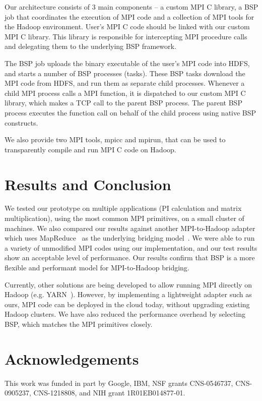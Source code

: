 \documentclass[10pt,twocolumn,letterpaper]{article}
\begin{document}
Our architecture consists of 3 main components -- a custom MPI C library, a BSP job that coordinates the execution of MPI code and a collection of MPI tools for the Hadoop environment. User's MPI C code should be linked with our custom MPI C library. This library is responsible for intercepting MPI procedure calls and delegating them to the underlying BSP framework. 

The BSP job uploads the binary executable of the user's MPI code into HDFS, and starts a number of BSP processes (tasks). These BSP tasks download the MPI code from HDFS, and run them as separate child processes. Whenever a child MPI process calls a MPI function, it is dispatched to our custom MPI C library, which makes a TCP call to the parent BSP process. The parent BSP process executes the function call on behalf of the child process using native BSP constructs. 

We also provide two MPI tools, mpicc and mpirun, that can be used to transparently compile and run MPI C code on Hadoop. 

\section{Results and Conclusion}
We tested our prototype on multiple applications (PI calculation and matrix multiplication), using the most common MPI primitives, on a small cluster of machines. We also compared our results against another MPI-to-Hadoop adapter which uses MapReduce~\cite{Dean:2008:MSD:1327452.1327492} as the underlying bridging model~\cite{SS12}. We were able to run a variety of unmodified MPI codes using our implementation, and our test results show an acceptable level of performance. Our results confirm that BSP is a more flexible and performant model for MPI-to-Hadoop bridging.

Currently, other solutions are being developed to allow running MPI directly on Hadoop (e.g. YARN~\cite{url:yarn}). However, by implementing a lightweight adapter such as ours, MPI code can be deployed in the cloud today, without upgrading existing Hadoop clusters. We have also reduced the performance overhead by selecting BSP, which matches the MPI primitives closely.

\section*{Acknowledgements}
This work was funded in part by Google, IBM, NSF grants CNS-0546737, CNS-0905237, CNS-1218808, and NIH grant 1R01EB014877-01.


 
\end{document}

